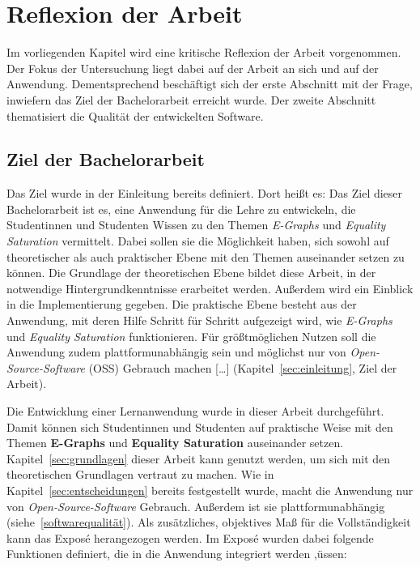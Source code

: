 \section{Reflexion der Arbeit}\label{sec:reflexion}

Im vorliegenden Kapitel wird eine kritische Reflexion der Arbeit vorgenommen. 
Der Fokus der Untersuchung liegt dabei auf der Arbeit an sich und auf der Anwendung.
Dementsprechend beschäftigt sich der erste Abschnitt mit der Frage, inwiefern das Ziel der Bachelorarbeit erreicht wurde.
Der zweite Abschnitt thematisiert die Qualität der entwickelten Software.

\subsection{Ziel der Bachelorarbeit}\label{sub:ziel}

Das Ziel wurde in der Einleitung bereits definiert. Dort heißt es: 
\glqq Das Ziel dieser Bachelorarbeit ist es, eine Anwendung für die Lehre zu entwickeln, die Studentinnen und Studenten Wissen zu den Themen \textit{E-Graphs} und \textit{Equality Saturation}
vermittelt. Dabei sollen sie die Möglichkeit haben, sich sowohl auf theoretischer als auch praktischer Ebene mit den Themen auseinander setzen zu können.
Die Grundlage der theoretischen Ebene bildet diese Arbeit, in der notwendige Hintergrundkenntnisse erarbeitet werden. Außerdem wird ein Einblick in die Implementierung gegeben. 
Die praktische Ebene besteht aus der Anwendung, mit deren Hilfe Schritt für Schritt aufgezeigt wird, wie \textit{E-Graphs} und \textit{Equality Saturation} funktionieren.
Für grö{\ss}tmöglichen Nutzen soll die Anwendung zudem plattformunabhängig sein und möglichst nur von \textit{Open-Source-Software} (OSS) Gebrauch machen [\ldots]\grqq 
(Kapitel~\ref{sec:einleitung}, Ziel der Arbeit).

Die Entwicklung einer Lernanwendung wurde in dieser Arbeit durchgeführt. Damit können sich Studentinnen und Studenten auf praktische Weise mit den Themen 
\textbf{E-Graphs} und \textbf{Equality Saturation} auseinander setzen. Kapitel~\ref{sec:grundlagen} dieser Arbeit kann genutzt werden, um sich mit den
theoretischen Grundlagen vertraut zu machen. 
Wie in Kapitel~\ref{sec:entscheidungen} bereits festgestellt wurde, macht die Anwendung nur von \textit{Open-Source-Software} Gebrauch. Außerdem ist
sie plattformunabhängig (siehe~\ref{softwarequalität}).
Als zusätzliches, objektives Maß für die Vollständigkeit kann das Exposé herangezogen werden.
Im Exposé wurden dabei folgende Funktionen definiert, die in die Anwendung integriert werden ,üssen:

